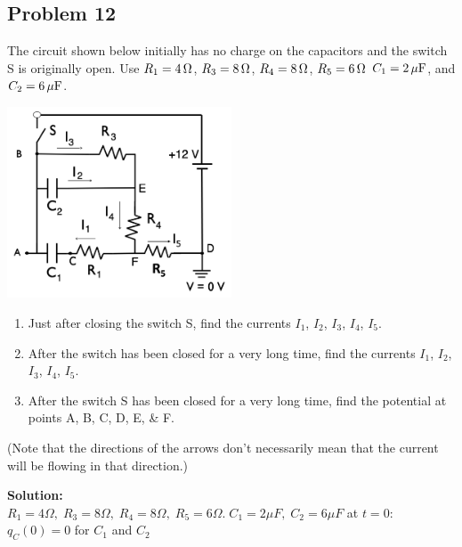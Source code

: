 \subsection*{Problem 12}
The circuit shown below initially has no charge on the capacitors and the switch S is
originally open. Use $R_1 = 4\,\mathrm{\Omega}$, $R_3 = 8\,\mathrm{\Omega}$, $R_4 = 8\,\mathrm{\Omega}$, $R_5 = 6\,\mathrm{\Omega}$ $C_1 =2\,\mathrm{\mu F}$, and $C_2 = 6\,\mathrm{\mu F}$.\\
\centerline{\includegraphics[width=0.5\textwidth]{Images/P12img1.png}}
\begin{enumerate}
    \item Just after closing the switch S, find the currents $I_1$, $I_2$, $I_3$, $I_4$, $I_5$.
    \item After the switch has been closed for a very long time, find the currents $I_1$, $I_2$, $I_3$, $I_4$, $I_5$.
    \item After the switch S has been closed for a very long time, find the potential at points A, B, C, D, E, \& F.
\end{enumerate}
(Note that the directions of the arrows don't necessarily mean that the current will be flowing in that direction.)

\textbf{Solution:}\\
$R_1=4\Omega,\;R_3=8\Omega,\;R_4=8\Omega,\;R_5=6\Omega.\;C_1=2\mu F,\;C_2=6\mu F$ at $t=0$: $q_C(0)=0$ for $C_1$ and $C_2$
\vspace{5mm}

